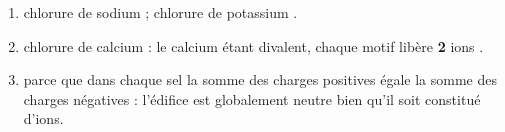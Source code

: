 \documentclass[11pt,a4paper]{article}
\begin{document}
\begin{corrige}
\begin{enumerate}[label=\alph*)]
  \item chlorure de sodium  ; chlorure de potassium .
  \item chlorure de calcium  : le calcium étant divalent, chaque motif libère \textbf{2} ions .
  \item parce que dans chaque sel la somme des charges positives égale la somme des charges négatives :
        l'édifice est globalement neutre bien qu'il soit constitué d'ions.
\end{enumerate}
\end{corrige}
\end{document}
